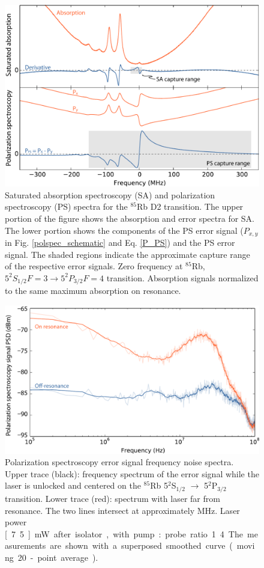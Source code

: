 \begin{figure}[htbp]
    \centering
    \includegraphics[width=\linewidth]{part1/Figs/fig2_v1.pdf}
    \caption{Saturated absorption spectroscopy (SA) and polarization spectroscopy (PS) spectra for the $^{85}$Rb D2 transition.
The upper portion of the figure shows the absorption and error spectra for SA.
The lower portion shows the components of the PS error signal ($P_{x,y}$ in Fig. \ref{polspec_schematic} and Eq. \ref{P_PS}) and the PS error signal.
The shaded regions indicate the approximate capture range of the respective error signals.
Zero frequency at $^{85}$Rb, $5^2S_{1/2} F=3\rightarrow5^2P_{3/2} F=4$ transition.
Absorption signals normalized to the same maximum absorption on resonance.}
    \label{sa_ps_spectra}
\end{figure}

\begin{figure}[hbp]
    \centering
    \includegraphics[width=\linewidth]{part1/Figs/fig3_v1.pdf}
    \caption{Polarization spectroscopy error signal frequency noise spectra.
Upper trace (black): frequency spectrum of the error signal while the laser is unlocked and centered on the $^{85}$Rb 5$^\text{2}$S$_\text{1/2}$ $\rightarrow$ 5$^\text{2}$P$_\text{3/2}$ transition.
Lower trace (red): spectrum with laser far from resonance.
The two lines intersect at approximately \unit[83]{MHz}.
Laser power \unit[7.5]{mW} after isolator, with pump:probe ratio 1.4.
The measurements are shown with a superposed smoothed curve (moving 20-point average).}
    \label{bandwidth}
\end{figure}

